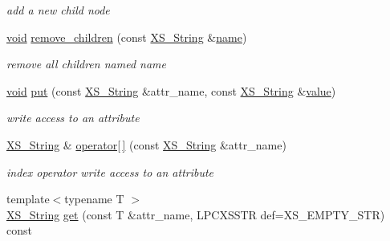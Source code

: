 \begin{DoxyCompactItemize}
\begin{DoxyCompactList}\small\item\em add a new child node \end{DoxyCompactList}\item 
\mbox{\label{struct_x_m_l_storage_1_1_x_m_l_node_a066b8036857d66514c0cc0a0457be8bb}} 
\hyperlink{interfacevoid}{void} \hyperlink{struct_x_m_l_storage_1_1_x_m_l_node_a066b8036857d66514c0cc0a0457be8bb}{remove\+\_\+children} (const \hyperlink{struct_x_m_l_storage_1_1_x_s___string}{X\+S\+\_\+\+String} \&\hyperlink{structname}{name})
\begin{DoxyCompactList}\small\item\em remove all children named \textquotesingle{}name\textquotesingle{} \end{DoxyCompactList}\item 
\mbox{\label{struct_x_m_l_storage_1_1_x_m_l_node_a34fa631b0b170ffb414b74b4c01aac61}} 
\hyperlink{interfacevoid}{void} \hyperlink{struct_x_m_l_storage_1_1_x_m_l_node_a34fa631b0b170ffb414b74b4c01aac61}{put} (const \hyperlink{struct_x_m_l_storage_1_1_x_s___string}{X\+S\+\_\+\+String} \&attr\+\_\+name, const \hyperlink{struct_x_m_l_storage_1_1_x_s___string}{X\+S\+\_\+\+String} \&\hyperlink{unionvalue}{value})
\begin{DoxyCompactList}\small\item\em write access to an attribute \end{DoxyCompactList}\item 
\mbox{\label{struct_x_m_l_storage_1_1_x_m_l_node_a209150f6997ed495d70ddcbdeecbe9f5}} 
\hyperlink{struct_x_m_l_storage_1_1_x_s___string}{X\+S\+\_\+\+String} \& \hyperlink{struct_x_m_l_storage_1_1_x_m_l_node_a209150f6997ed495d70ddcbdeecbe9f5}{operator\mbox{[}$\,$\mbox{]}} (const \hyperlink{struct_x_m_l_storage_1_1_x_s___string}{X\+S\+\_\+\+String} \&attr\+\_\+name)
\begin{DoxyCompactList}\small\item\em index operator write access to an attribute \end{DoxyCompactList}\item 
\mbox{\label{struct_x_m_l_storage_1_1_x_m_l_node_a87e612411a8267fbaa273f2d231bf042}} 
{\footnotesize template$<$typename T $>$ }\\\hyperlink{struct_x_m_l_storage_1_1_x_s___string}{X\+S\+\_\+\+String} \hyperlink{struct_x_m_l_storage_1_1_x_m_l_node_a87e612411a8267fbaa273f2d231bf042}{get} (const T \&attr\+\_\+name, L\+P\+C\+X\+S\+S\+TR def=X\+S\+\_\+\+E\+M\+P\+T\+Y\+\_\+\+S\+TR) const

\end{DoxyCompactItemize}
